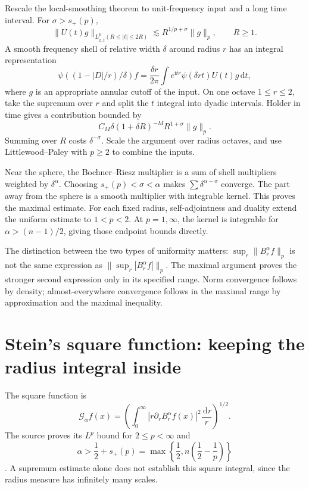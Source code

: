 \documentclass[11pt,a4paper]{article}
\numberwithin{equation}{section}
\theoremstyle{definition}
\theoremstyle{remark}
\newcommand{\dd}{\,\mathrm d}
\begin{document}
Rescale the local-smoothing theorem to unit-frequency input and a long time
interval. For $\sigma>s_+(p)$,
\[
 \|U(t)g\|_{L^p_{x,t}(R\le|t|\le2R)}
 \lesssim R^{1/p+\sigma}\|g\|_p,
 \qquad R\ge1.
\]
A smooth frequency shell of relative width $\delta$ around radius $r$ has
an integral representation
\[
 \psi((1-|D|/r)/\delta)f
 =\frac{\delta r}{2\pi}\int e^{\mathrm itr}
                  \widehat\psi(\delta rt)U(t)g\dd t,
\]
where $g$ is an appropriate annular cutoff of the input. On one octave
$1\le r\le2$, take the supremum over $r$ and split the $t$ integral into
dyadic intervals. Holder in time gives a contribution bounded by
\[
 C_M\delta(1+\delta R)^{-M}R^{1+\sigma}\|g\|_p.
\]
Summing over $R$ costs $\delta^{-\sigma}$. Scale the argument over radius
octaves, and use Littlewood--Paley with $p\ge2$ to combine the inputs.

Near the sphere, the Bochner--Riesz multiplier is a sum of shell multipliers
weighted by $\delta^\alpha$. Choosing $s_+(p)<\sigma<\alpha$ makes
$\sum\delta^{\alpha-\sigma}$ converge. The part away from the sphere is a
smooth multiplier with integrable kernel. This proves the maximal estimate.
For each fixed radius, self-adjointness and duality extend the uniform estimate
to $1<p<2$. At $p=1,\infty$, the kernel is integrable for
$\alpha>(n-1)/2$, giving those endpoint bounds directly.

The distinction between the two types of uniformity matters:
$\sup_r\|B_r^\alpha f\|_p$ is not the same expression as
$\|\sup_r|B_r^\alpha f|\|_p$. The maximal argument proves the stronger second
expression only in its specified range. Norm convergence follows by density;
almost-everywhere convergence follows in the maximal range by approximation
and the maximal inequality.

\section{Stein's square function: keeping the radius integral inside}
\label{sec:square}
The square function is
\[
 \mathcal G_\alpha f(x)=
 \left(\int_0^\infty|r\partial_rB_r^\alpha f(x)|^2\frac{\dd r}{r}\right)^{1/2}.
\]
The source proves its $L^p$ bound for $2\le p<\infty$ and
\begin{equation}\label{eq:squarethreshold}
 \alpha>\frac12+s_+(p)
     =\max\left\{\frac12,n\left(\frac12-\frac1p\right)\right\}
\end{equation}
\cite{stein}. A supremum estimate alone does not establish this square
integral, since the radius measure has infinitely many scales.
\end{document}
